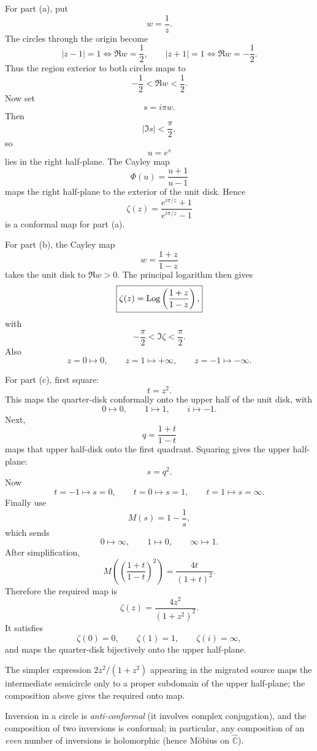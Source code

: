 

\begin{solution}
For part (a), put
\[
w=\frac1z.
\]
The circles through the origin become
\[
|z-1|=1\iff \Re w=\frac12,
\qquad
|z+1|=1\iff \Re w=-\frac12.
\]
Thus the region exterior to both circles maps to
\[
-\frac12<\Re w<\frac12.
\]
Now set
\[
s=i\pi w.
\]
Then
\[
|\Im s|<\frac{\pi}{2},
\]
so
\[
u=e^s
\]
lies in the right half-plane. The Cayley map
\[
\Phi(u)=\frac{u+1}{u-1}
\]
maps the right half-plane to the exterior of the unit disk. Hence
\[
\boxed{
\zeta(z)
=
\frac{e^{i\pi/z}+1}{e^{i\pi/z}-1}
}
\]
is a conformal map for part (a).

For part (b), the Cayley map
\[
w=\frac{1+z}{1-z}
\]
takes the unit disk to \(\Re w>0\). The principal logarithm then gives
\[
\boxed{
\zeta(z)
=
\operatorname{Log}\left(\frac{1+z}{1-z}\right),
}
\]
with
\[
-\frac{\pi}{2}<\Im\zeta<\frac{\pi}{2}.
\]
Also
\[
z=0\mapsto0,\qquad
z=1\mapsto+\infty,\qquad
z=-1\mapsto-\infty.
\]

For part (c), first square:
\[
t=z^2.
\]
This maps the quarter-disk conformally onto the upper half of the unit disk, with
\[
0\mapsto0,\qquad1\mapsto1,\qquad i\mapsto-1.
\]
Next,
\[
q=\frac{1+t}{1-t}
\]
maps that upper half-disk onto the first quadrant. Squaring gives the upper half-plane:
\[
s=q^2.
\]
Now
\[
t=-1\mapsto s=0,\qquad
t=0\mapsto s=1,\qquad
t=1\mapsto s=\infty.
\]
Finally use
\[
M(s)=1-\frac1s,
\]
which sends
\[
0\mapsto\infty,\qquad1\mapsto0,\qquad\infty\mapsto1.
\]
After simplification,
\[
M\!\left(\left(\frac{1+t}{1-t}\right)^2\right)
=
\frac{4t}{(1+t)^2}.
\]
Therefore the required map is
\[
\boxed{
\zeta(z)
=
\frac{4z^2}{(1+z^2)^2}.
}
\]
It satisfies
\[
\zeta(0)=0,\qquad
\zeta(1)=1,\qquad
\zeta(i)=\infty,
\]
and maps the quarter-disk bijectively onto the upper half-plane.

The simpler expression \(2z^2/(1+z^2)\) appearing in the migrated source maps the intermediate semicircle only to a proper subdomain of the upper half-plane; the composition above gives the required onto map.
\end{solution}


\begin{problem}[CP-IV-0019]
\label{prob:cp-iv-0019}
\par\noindent\textbullet\quad Inversion in a circle is \emph{anti-conformal} (it involves complex conjugation), and the composition of two inversions is conformal; in particular, any composition of an \emph{even} number of inversions is holomorphic (hence Möbius on $\widehat{\mathbb C}$).
\end{problem}

